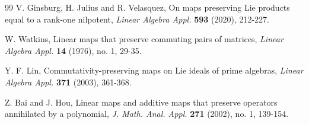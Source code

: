 \documentclass{amsart}
\theoremstyle{definition}
\theoremstyle{remark}
\numberwithin{equation}{section}
\begin{document}
\begin{thebibliography}{99}
 V. Ginsburg, H. Julius and R. Velasquez, On maps preserving Lie products equal to a rank-one nilpotent, {\it Linear Algebra Appl.} {\bf{593}} (2020), 212-227.

 W. Watkins, Linear maps that preserve commuting pairs of matrices, {\it Linear Algebra Appl.} {\bf{14}} (1976), no. 1, 29-35.

  Y. F. Lin, Commutativity-preserving maps on Lie ideals of prime algebras, {\it Linear Algebra Appl.} {\bf{371}} (2003), 361-368.

   Z. Bai and J. Hou, Linear maps and additive maps that preserve operators annihilated by a polynomial, {\it J. Math. Anal. Appl.} {\bf{271}} (2002), no. 1, 139-154.      
\end{thebibliography}
	
\end{document}
